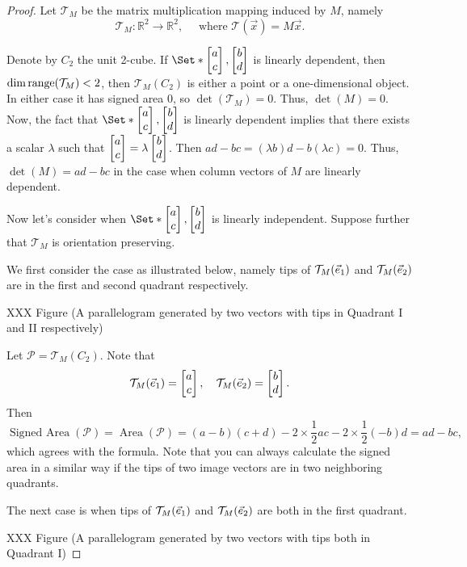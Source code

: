 \begin{proof}
Let $\mathcal{T}_{M}$ be the matrix multiplication mapping induced by $M$, namely
\[
	\mathcal{T}_{M}:\mathbb{R}^{2}\rightarrow\mathbb{R}^{2},\quad\text{ where }
	\mathcal{T}(\vec x)=M\vec x.
\]

Denote by $C_{2}$ the unit 2-cube. If $\Set*{\matc{a \\ c},\matc{b \\ d}}$ is linearly
dependent, then $\dim \operatorname{range}(\mathcal{T}_{M})<2$, then $\mathcal{T}_{{M}}(C_{2})$
is either a point or a one-dimensional object. In either case it has signed area
$0$, so $\det(\mathcal{T}_{M})=0$. Thus, $\det(M)=0$. Now, the fact that $\Set*{\matc{a \\ c},\matc{b \\ d}}$
is linearly dependent implies that there exists a scalar $\lambda$ such that $\begin{bmatrix}a \\ c\end{bmatrix}=\lambda\begin{bmatrix}b \\ d\end{bmatrix}$. Then $ad-bc=(\lambda b)d-b(\lambda c)=0$. Thus,
$\det(M)=ad-bc$ in the case when column vectors of $M$ are linearly dependent.

Now let's consider when $\Set*{\matc{a \\ c},\matc{b \\ d}}$ is linearly
independent. Suppose further that $\mathcal{T}_{M}$ is orientation preserving.

We first consider the case as illustrated below, namely tips of
$\mathcal{T}_{M}({\vec e_1})$ and $\mathcal{T}_{M}({\vec e_2})$ are in the first and
second quadrant respectively.

XXX Figure (A parallelogram generated by two vectors with tips in Quadrant I and
II respectively)

Let $\mathcal{P}=\mathcal{T}_{M}(C_{2})$. Note that
\[
	\mathcal{T}_{M}({\vec e_1})= \begin{bmatrix}a \\ c\end{bmatrix},\quad \mathcal{T}_{M}({\vec e_2})=\begin{bmatrix}b \\ d\end{bmatrix}.
\]
Then
\[
	\operatorname{Signed~Area}(\mathcal{P})=\operatorname{Area}(\mathcal{P})=(a-b)(c+d)-2\times \frac{1}{2}ac-2\times \frac{1}{2}(-b)d=ad-bc,
\]
which agrees with the formula. Note that you can always calculate the signed area
in a similar way if the tips of two image vectors are in two neighboring quadrants.

The next case is when tips of $\mathcal{T}_{M}({\vec e_1})$ and $\mathcal{T}_{M}({\vec e_2}
)$ are both in the first quadrant.

XXX Figure (A parallelogram generated by two vectors with tips both in Quadrant
I)


\end{proof}
